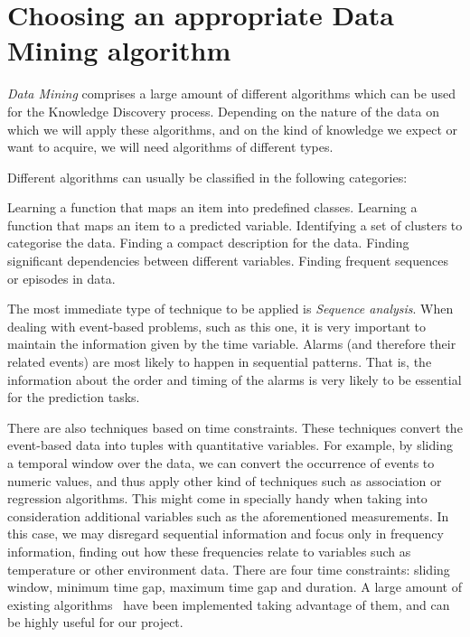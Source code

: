 \section{Choosing an appropriate Data Mining algorithm}

\emph{Data Mining} comprises a large amount of different algorithms which can be used for the Knowledge Discovery process. Depending on the nature of the data on which we will apply these algorithms, and on the kind of knowledge we expect or want to acquire, we will need algorithms of different types.

Different algorithms can usually be classified in the following categories:

\begin{enumerate}
  Learning a function that maps an item into predefined classes.
  Learning a function that maps an item to a predicted variable.
  Identifying a set of clusters to categorise the data.
  Finding a compact description for the data.
  Finding significant dependencies between different variables.\cite{Zhao2003}
  Finding frequent sequences or episodes in data.\cite{Zhao2003a}\cite{Weiss2002}
\end{enumerate}

The most immediate type of technique to be applied is \emph{Sequence analysis}. When dealing with event-based problems, such as this one, it is very important to maintain the information given by the time variable. Alarms (and therefore their related events) are most likely to happen in sequential patterns. That is, the information about the order and timing of the alarms is very likely to be essential for the prediction tasks.

There are also techniques based on time constraints\cite{Suh2011}. These techniques convert the event-based data into tuples with quantitative variables. For example, by sliding a temporal window over the data, we can convert the occurrence of events to numeric values, and thus apply other kind of techniques such as association or regression algorithms. This might come in specially handy when taking into consideration additional variables such as the aforementioned measurements. In this case, we may disregard sequential information and focus only in frequency information, finding out how these frequencies relate to variables such as temperature or other environment data. There are four time constraints: sliding window, minimum time gap, maximum time gap and duration. A large amount of existing algorithms~\cite{Wu2010} have been implemented taking advantage of them, and can be highly useful for our project.